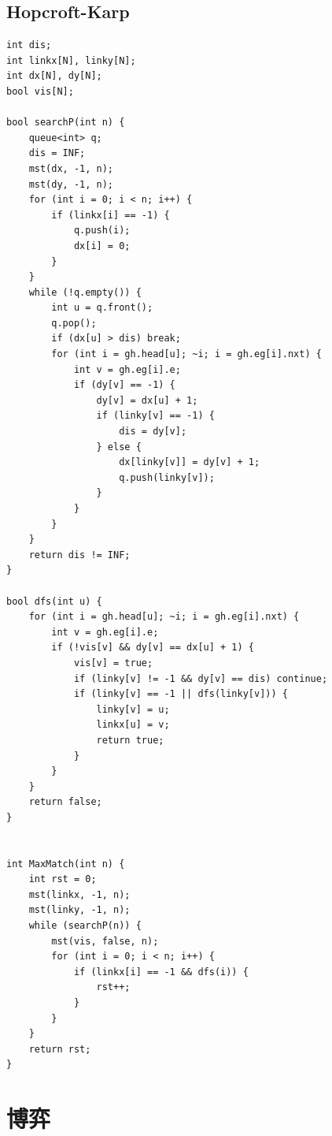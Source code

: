 \documentclass[twoside]{article}
\begin{document}
\subsection{Hopcroft-Karp}
\begin{lstlisting}
int dis;
int linkx[N], linky[N];
int dx[N], dy[N];
bool vis[N];

bool searchP(int n) {
    queue<int> q;
    dis = INF;
    mst(dx, -1, n);
    mst(dy, -1, n);
    for (int i = 0; i < n; i++) {
        if (linkx[i] == -1) {
            q.push(i);
            dx[i] = 0;
        }
    }
    while (!q.empty()) {
        int u = q.front();
        q.pop();
        if (dx[u] > dis) break;
        for (int i = gh.head[u]; ~i; i = gh.eg[i].nxt) {
            int v = gh.eg[i].e;
            if (dy[v] == -1) {
                dy[v] = dx[u] + 1;
                if (linky[v] == -1) {
                    dis = dy[v];
                } else {
                    dx[linky[v]] = dy[v] + 1;
                    q.push(linky[v]);
                }
            }
        }
    }
    return dis != INF;
}

bool dfs(int u) {
    for (int i = gh.head[u]; ~i; i = gh.eg[i].nxt) {
        int v = gh.eg[i].e;
        if (!vis[v] && dy[v] == dx[u] + 1) {
            vis[v] = true;
            if (linky[v] != -1 && dy[v] == dis) continue;
            if (linky[v] == -1 || dfs(linky[v])) {
                linky[v] = u;
                linkx[u] = v;
                return true;
            }
        }
    }
    return false;
}


int MaxMatch(int n) {
    int rst = 0;
    mst(linkx, -1, n);
    mst(linky, -1, n);
    while (searchP(n)) {
        mst(vis, false, n);
        for (int i = 0; i < n; i++) {
            if (linkx[i] == -1 && dfs(i)) {
                rst++;
            }
        }
    }
    return rst;
}\end{lstlisting}
\clearpage\section{博弈}
\end{document}
